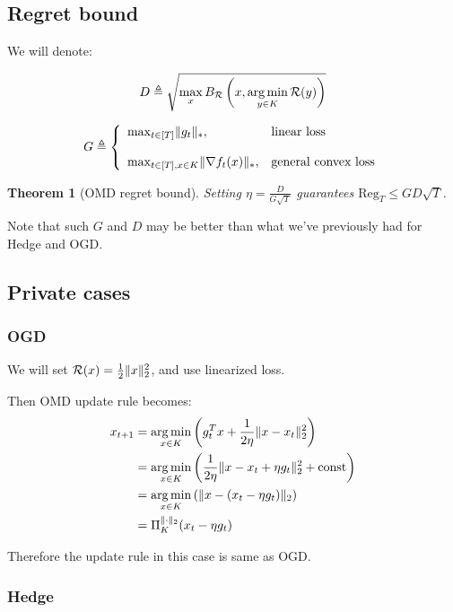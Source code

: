 \documentclass[11pt]{article}
\newtheorem{theorem}{Theorem}[section]
\theoremstyle{definition}
\theoremstyle{definition}
\newcommand{\pth}[1]{\left( #1\right)}                 %
\newcommand{\brk}[1]{\left[ #1\right]}                 %
\newcommand{\Kset}{\ensuremath{K}}
\renewcommand{\regret}{\ensuremath{\mathrm{{Reg}}}}
\begin{document}
\subsection{Regret bound}

We will denote:

\begin{equation*}
D \triangleq \sqrt{ \max_{x} B_\R \pth{ x, \argmin_{y \in \Kset}{\R(y)}}}
\end{equation*}

\begin{equation*}
G \triangleq \mycases{\max_{t \in \brk{T}} \norm{g_t}_* }{\text{linear loss}}{\max_{t \in \brk{T}, x \in \Kset} \norm{ \nabla f_t(x) }_* }{\text{general convex loss}}
\end{equation*}

\begin{theorem}[OMD regret bound]
Setting $ \eta = \frac{D}{G \sqrt{T}} $ guarantees $ \regret_T \leq G D \sqrt{T}$.
\end{theorem}

Note that such $G$ and $D$ may be better than what we've previously had for Hedge and OGD.


\subsection{Private cases}

\subsubsection{OGD}

We will set $ \mathcal R(x) = \frac{1}{2} \mathopen\| x \mathclose\|_2^2 $, and use linearized loss.

Then OMD update rule becomes:
\begin{equation*}
\begin{aligned}
x_{t+1}
&= \argmin_{x \in \Kset} \pth{ g_t^T x + \frac{1}{2 \eta} \norm{x - x_t}_2^2 }
\\&= \argmin_{x \in \Kset} \pth{ \frac{1}{2 \eta} \norm{x - x_t + \eta g_t}_2^2 + \text{const} }
\\&= \argmin_{x \in \Kset} \pth{ \norm{x - (x_t - \eta g_t)}_2 }
\\&= \Pi_\Kset^{\norm{\cdot}_2} (x_t - \eta g_t)
\end{aligned}
\end{equation*}

Therefore the update rule in this case is same as OGD.


\subsubsection{Hedge}
\end{document}
